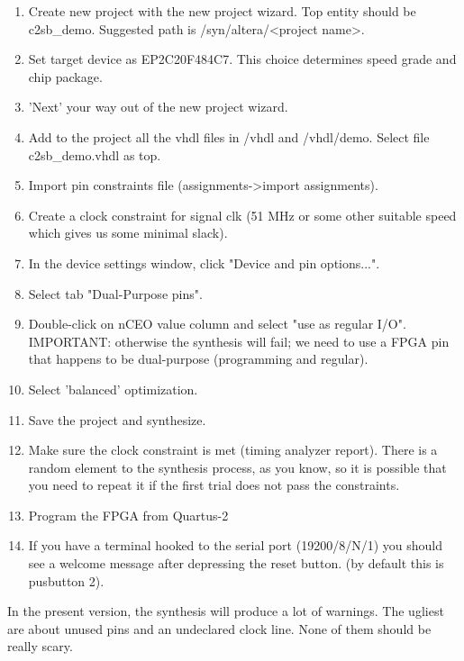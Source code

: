 \documentclass[11pt]{article}
\begin{document}
    \begin{enumerate}
        \item Create new project with the new project wizard.
            Top entity should be c2sb\_demo.
            Suggested path is /syn/altera/<project name>.
        \item Set target device as EP2C20F484C7.
            This choice determines speed grade and chip package.
        \item 'Next' your way out of the new project wizard.
        \item Add to the project all the vhdl files in /vhdl and /vhdl/demo.
            Select file c2sb\_demo.vhdl as top.
        \item Import pin constraints file (assignments->import assignments).
        \item Create a clock constraint for signal clk (51 MHz or some other
            suitable speed which gives us some minimal slack).
        \item In the device settings window, click "Device and pin options...".
        \item Select tab "Dual-Purpose pins".
        \item Double-click on nCEO value column and select "use as regular I/O".
            IMPORTANT: otherwise the synthesis will fail; we need to use a FPGA
            pin that happens to be dual-purpose (programming and regular).
        \item Select 'balanced' optimization.
        \item Save the project and synthesize.
        \item Make sure the clock constraint is met (timing analyzer report).
            There is a random element to the synthesis process, as you know,
            so it is possible that you need to repeat it if the first trial does
            not pass the constraints.
        \item Program the FPGA from Quartus-2
        \item If you have a terminal hooked to the serial port (19200/8/N/1) you
            should see a welcome message after depressing the reset button.
            (by default this is pusbutton 2).

    \end{enumerate}
    
    In the present version, the synthesis will produce a lot of warnings. The 
    ugliest are about unused pins and an undeclared clock line. None of them 
    should be really scary.\\
\end{document}
